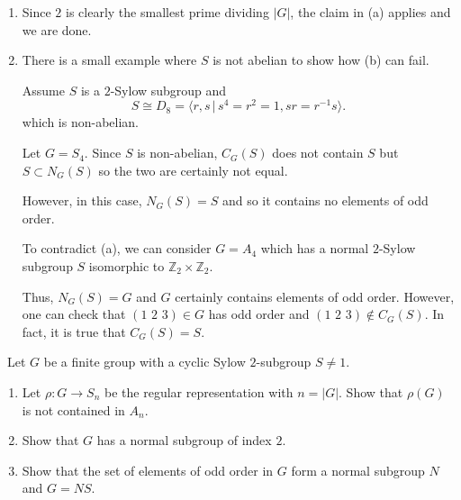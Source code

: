 \documentclass[12pt]{AlgebraQual}
\begin{document}
\begin{solution}
\begin{enumerate}[label=(\alph*)]
\begin{claim}
\begin{proof}
    Namely, $$N_G(P)=C_G(P).$$
    \end{proof}
    \end{claim}
    \item Since $2$ is clearly the smallest prime dividing $|G|$, the claim in (a) applies and we are done.
    \item There is a small example where $S$ is not abelian to show how (b) can fail.

    Assume $S$ is a $2$-Sylow subgroup and $$S\cong D_8=\langle r,s\,|\,s^4=r^2=1,sr=r^{-1}s\rangle.$$ which is non-abelian.

    Let $G=S_4.$ Since $S$ is non-abelian, $C_G(S)$ does not contain $S$ but $S\subset N_G(S)$ so the two are certainly not equal.

    However, in this case, $N_G(S)=S$ and so it contains no elements of odd order.

    To contradict (a), we can consider $G=A_4$ which has a normal $2$-Sylow subgroup $S$ isomorphic to $\mathbb{Z}_2\times\mathbb{Z}_2.$

    Thus, $N_G(S)=G$ and $G$ certainly contains elements of odd order. However, one can check that $(1\,\, 2\,\, 3)\in G$ has odd order and $(1\,\, 2\, \, 3)\notin C_G(S).$ In fact, it is true that $C_G(S)=S.$
    \end{enumerate}
\end{solution}
\newpage


\begin{problem} $\,$
Let $G$ be a finite group with a cyclic Sylow $2$-subgroup $S\not=1.$
\begin{enumerate}[label=(\alph*)]
    \item Let $\rho:G\to S_n$ be the regular representation with $n=|G|.$ Show that $\rho(G)$ is not contained in $A_n.$
    \item Show that $G$ has a normal subgroup of index $2.$
    \item Show that the set of elements of odd order in $G$ form a normal subgroup $N$ and $G=NS.$
\end{enumerate}
\end{problem}
\end{document}

